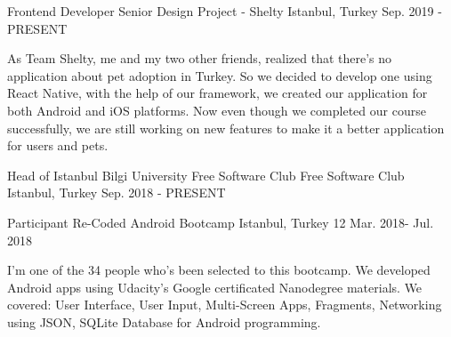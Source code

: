 


\begin{cventries}


\cventry
{Frontend Developer} %
{Senior Design Project - Shelty} %
{Istanbul, Turkey} %
{Sep. 2019 - PRESENT} %
{ %
\begin{cvitems}
\item {As Team Shelty, me and my two other friends, realized that there's no application about pet adoption in Turkey. So we decided to develop one using React Native, with the help of our framework, we created our application for both Android and iOS platforms. Now even though we completed our course successfully, we are still working on new features to make it a better application for users and pets.}
\end{cvitems}
}


\cventry
{Head of Istanbul Bilgi University Free Software Club} %
{Free Software Club} %
{Istanbul, Turkey} %
{Sep. 2018 - PRESENT} %
{ %
}


\cventry
{Participant} %
{Re-Coded Android Bootcamp} %
{Istanbul, Turkey} %
{12 Mar. 2018- Jul. 2018} %
{ %
\begin{cvitems}
\item {I'm one of the 34 people who's been selected to this bootcamp. We developed Android apps using Udacity's Google certificated Nanodegree materials. We covered: User Interface, User Input, Multi-Screen Apps, Fragments, Networking using JSON, SQLite Database for Android programming.}
\end{cvitems}
}




\end{cventries}
